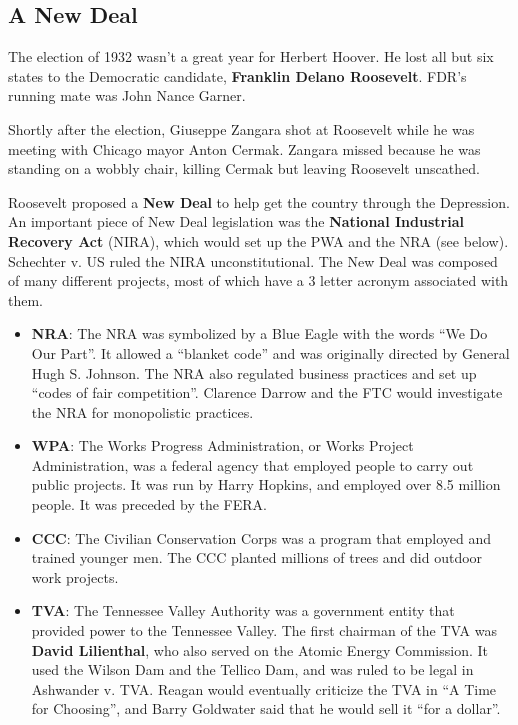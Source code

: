 \subsection*{A New Deal}

The election of 1932 wasn't a great year for Herbert Hoover.
He lost all but six states to the Democratic candidate, \textbf{Franklin Delano Roosevelt}.
FDR's running mate was John Nance Garner.

Shortly after the election, Giuseppe Zangara shot at Roosevelt while he was meeting with Chicago mayor Anton Cermak.
Zangara missed because he was standing on a wobbly chair, killing Cermak but leaving Roosevelt unscathed.

Roosevelt proposed a \textbf{New Deal} to help get the country through the Depression.
An important piece of New Deal legislation was the \textbf{National Industrial Recovery Act} (NIRA),
which would set up the PWA and the NRA (see below).
Schechter v. US ruled the NIRA unconstitutional.
The New Deal was composed of many different projects, most of which have a 3 letter acronym associated with them.

\begin{itemize}
  \item
    \textbf{NRA}:
    The NRA was symbolized by a Blue Eagle with the words ``We Do Our Part''.
    It allowed a ``blanket code'' and was originally directed by General Hugh S. Johnson.
    The NRA also regulated business practices and set up ``codes of fair competition''.
    Clarence Darrow and the FTC would investigate the NRA for monopolistic practices.

  \item
    \textbf{WPA}:
    The Works Progress Administration, or Works Project Administration,
    was a federal agency that employed people to carry out public projects.
    It was run by Harry Hopkins, and employed over 8.5 million people.
    It was preceded by the FERA\@.

  \item
    \textbf{CCC}:
    The Civilian Conservation Corps was a program that employed and trained younger men.
    The CCC planted millions of trees and did outdoor work projects.

  \item
    \textbf{TVA}:
    The Tennessee Valley Authority was a government entity that provided power to the Tennessee Valley.
    The first chairman of the TVA was \textbf{David Lilienthal},
    who also served on the Atomic Energy Commission.
    It used the Wilson Dam and the Tellico Dam, and was ruled to be legal in Ashwander v. TVA\@.
    Reagan would eventually criticize the TVA in ``A Time for Choosing'',
    and Barry Goldwater said that he would sell it ``for a dollar''.
\end{itemize}

